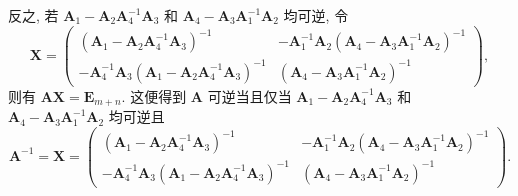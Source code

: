 \documentclass[../../main.tex]{subfiles}
\begin{document}
\begin{solution}
反之, 若 \(\boldsymbol{A}_1 - \boldsymbol{A}_2\boldsymbol{A}_4^{-1}\boldsymbol{A}_3\) 和 \(\boldsymbol{A}_4 - \boldsymbol{A}_3\boldsymbol{A}_1^{-1}\boldsymbol{A}_2\) 均可逆, 令
\[
\boldsymbol{X} = \begin{pmatrix} (\boldsymbol{A}_1 - \boldsymbol{A}_2\boldsymbol{A}_4^{-1}\boldsymbol{A}_3)^{-1} & -\boldsymbol{A}_1^{-1}\boldsymbol{A}_2(\boldsymbol{A}_4 - \boldsymbol{A}_3\boldsymbol{A}_1^{-1}\boldsymbol{A}_2)^{-1} \\ -\boldsymbol{A}_4^{-1}\boldsymbol{A}_3(\boldsymbol{A}_1 - \boldsymbol{A}_2\boldsymbol{A}_4^{-1}\boldsymbol{A}_3)^{-1} & (\boldsymbol{A}_4 - \boldsymbol{A}_3\boldsymbol{A}_1^{-1}\boldsymbol{A}_2)^{-1} \end{pmatrix},
\]
则有 \(\boldsymbol{A}\boldsymbol{X} = \boldsymbol{E}_{m + n}\). 这便得到 \(\boldsymbol{A}\) 可逆当且仅当 \(\boldsymbol{A}_1 - \boldsymbol{A}_2\boldsymbol{A}_4^{-1}\boldsymbol{A}_3\) 和 \(\boldsymbol{A}_4 - \boldsymbol{A}_3\boldsymbol{A}_1^{-1}\boldsymbol{A}_2\) 均可逆且
\[
\boldsymbol{A}^{-1} = \boldsymbol{X} = \begin{pmatrix} (\boldsymbol{A}_1 - \boldsymbol{A}_2\boldsymbol{A}_4^{-1}\boldsymbol{A}_3)^{-1} & -\boldsymbol{A}_1^{-1}\boldsymbol{A}_2(\boldsymbol{A}_4 - \boldsymbol{A}_3\boldsymbol{A}_1^{-1}\boldsymbol{A}_2)^{-1} \\ -\boldsymbol{A}_4^{-1}\boldsymbol{A}_3(\boldsymbol{A}_1 - \boldsymbol{A}_2\boldsymbol{A}_4^{-1}\boldsymbol{A}_3)^{-1} & (\boldsymbol{A}_4 - \boldsymbol{A}_3\boldsymbol{A}_1^{-1}\boldsymbol{A}_2)^{-1} \end{pmatrix}.
\]


\end{solution}
\end{document}
